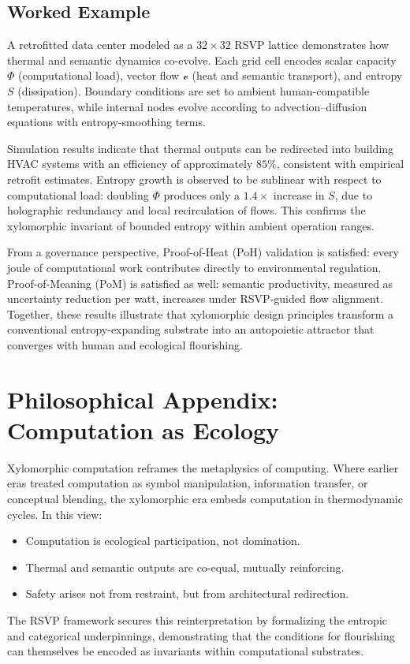 \documentclass[12pt]{article}
\begin{document}
\subsection{Worked Example}

A retrofitted data center modeled as a $32 \times 32$ RSVP lattice demonstrates how thermal and semantic dynamics co-evolve. Each grid cell encodes scalar capacity $\Phi$ (computational load), vector flow $\mathcal{v}$ (heat and semantic transport), and entropy $S$ (dissipation). Boundary conditions are set to ambient human-compatible temperatures, while internal nodes evolve according to advection–diffusion equations with entropy-smoothing terms.

Simulation results indicate that thermal outputs can be redirected into building HVAC systems with an efficiency of approximately $85\%$, consistent with empirical retrofit estimates. Entropy growth is observed to be sublinear with respect to computational load: doubling $\Phi$ produces only a $1.4\times$ increase in $S$, due to holographic redundancy and local recirculation of flows. This confirms the xylomorphic invariant of bounded entropy within ambient operation ranges.

From a governance perspective, Proof-of-Heat (PoH) validation is satisfied: every joule of computational work contributes directly to environmental regulation. Proof-of-Meaning (PoM) is satisfied as well: semantic productivity, measured as uncertainty reduction per watt, increases under RSVP-guided flow alignment. Together, these results illustrate that xylomorphic design principles transform a conventional entropy-expanding substrate into an autopoietic attractor that converges with human and ecological flourishing.

\section{Philosophical Appendix: Computation as Ecology}

Xylomorphic computation reframes the metaphysics of computing. Where earlier eras treated computation as symbol manipulation, information transfer, or conceptual blending, the xylomorphic era embeds computation in thermodynamic cycles. In this view:
\begin{itemize}
    \item Computation is ecological participation, not domination.
    \item Thermal and semantic outputs are co-equal, mutually reinforcing.
    \item Safety arises not from restraint, but from architectural redirection.
\end{itemize}

The RSVP framework secures this reinterpretation by formalizing the entropic and categorical underpinnings, demonstrating that the conditions for flourishing can themselves be encoded as invariants within computational substrates.

\newpage


\end{document}
